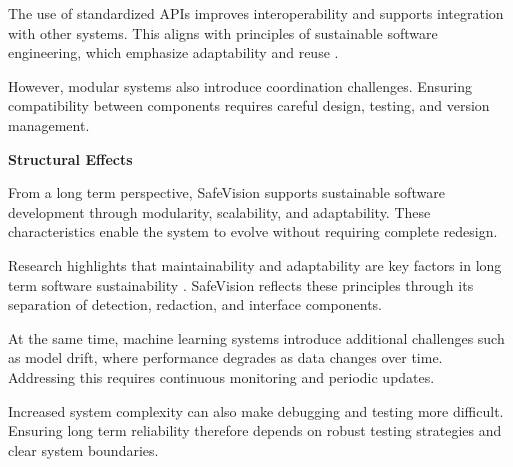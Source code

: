 The use of standardized APIs improves interoperability and supports integration with other systems. This aligns with principles of sustainable software engineering, which emphasize adaptability and reuse \cite{becker2015requirements}.

However, modular systems also introduce coordination challenges. Ensuring compatibility between components requires careful design, testing, and version management.

\noindent\textbf{Structural Effects}

From a long term perspective, SafeVision supports sustainable software development through modularity, scalability, and adaptability. These characteristics enable the system to evolve without requiring complete redesign.

Research highlights that maintainability and adaptability are key factors in long term software sustainability \cite{venters2014software}. SafeVision reflects these principles through its separation of detection, redaction, and interface components.

At the same time, machine learning systems introduce additional challenges such as model drift, where performance degrades as data changes over time. Addressing this requires continuous monitoring and periodic updates.

Increased system complexity can also make debugging and testing more difficult. Ensuring long term reliability therefore depends on robust testing strategies and clear system boundaries.
